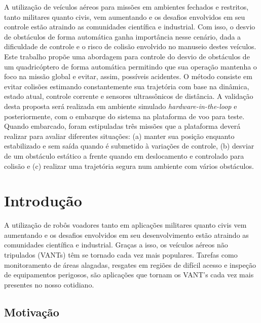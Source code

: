 \documentclass[a4paper, 12pt]{article}
\begin{document}
\newpage

\abstract

A utilização de veículos aéreos para missões em ambientes fechados e restritos, tanto militares quanto civis, vem aumentando e os desafios envolvidos em seu controle estão atraindo as comunidades científica e industrial. Com isso, o desvio de obstáculos de forma automática ganha importância nesse cenário, dada a dificuldade de controle e o risco de colisão envolvido no manuseio destes veículos. Este trabalho propõe uma abordagem para controle do desvio de obstáculos de um quadricóptero de forma automática permitindo que sua operação mantenha o foco na missão global e evitar, assim, possíveis acidentes. O método consiste em evitar colisões estimando constantemente sua trajetória com base na dinâmica, estado atual, controle corrente e sensores ultrassônicos de distância. A validação desta proposta será realizada em ambiente simulado \textit{hardware-in-the-loop} e posteriormente, com o embarque do sistema na plataforma de voo para teste. Quando embarcado, foram estipuladas três missões que a plataforma deverá realizar para avaliar diferentes situações: (a) manter sua posição enquanto estabilizado e sem saída quando é submetido à variações de controle, (b) desviar de um obstáculo estático a frente quando em deslocamento e controlado para colisão e (c) realizar uma trajetória segura num ambiente com vários obstáculos. 
 
\newpage

\tableofcontents

\newpage

\listoffigures

\newpage

\section{Introdução}

A utilização de robôs voadores tanto em aplicações militares quanto civis vem aumentando e os desafios envolvidos em seu desenvolvimento estão atraindo as comunidades científica e industrial. Graças a isso, os veículos aéreos não tripulados (VANTs) têm se tornado cada vez mais populares. Tarefas como monitoramento de áreas alagadas, resgates em regiões de difícil acesso e inspeção de equipamentos perigosos, são aplicações que tornam os VANT's cada vez mais presentes no nosso cotidiano.

\subsection{Motivação}
\end{document}

